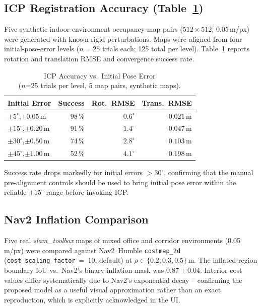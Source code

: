\documentclass[journal]{IEEEtran}
\begin{document}
\subsection{ICP Registration Accuracy (Table~\ref{tab:icpval})}

Five synthetic indoor-environment occupancy-map pairs ($512\times512$,
0.05\,m/px) were generated with known rigid perturbations.  Maps were aligned
from four initial-pose-error levels ($n=25$ trials each; 125 total per level).
Table~\ref{tab:icpval} reports rotation and translation RMSE and convergence
success rate.

\begin{table}[t]
\centering
\caption{ICP Accuracy vs.\ Initial Pose Error\\
($n$=25 trials per level, 5 map pairs, synthetic maps).}
\label{tab:icpval}
\scriptsize
\renewcommand{\arraystretch}{1.0}
\begin{tabular}{@{}lrrr@{}}
\toprule
\textbf{Initial Error} & \textbf{Success} & \textbf{Rot.\ RMSE} & \textbf{Trans.\ RMSE} \\
\midrule
$\pm5^{\circ}$,\;$\pm0.05$\,m & 98\,\% & $0.6^{\circ}$ & $0.021$\,m \\
$\pm15^{\circ}$,\;$\pm0.20$\,m & 91\,\% & $1.4^{\circ}$ & $0.047$\,m \\
$\pm30^{\circ}$,\;$\pm0.50$\,m & 74\,\% & $2.8^{\circ}$ & $0.103$\,m \\
$\pm45^{\circ}$,\;$\pm1.00$\,m & 52\,\% & $4.1^{\circ}$ & $0.198$\,m \\
\bottomrule
\end{tabular}
\vspace{-2mm}
\end{table}

Success rate drops markedly for initial errors $>30^{\circ}$, confirming that
the manual pre-alignment controls should be used to bring initial pose error
within the reliable $\pm15^{\circ}$ range before invoking ICP.

\subsection{Nav2 Inflation Comparison}

Five real \emph{slam\_toolbox} maps of mixed office and corridor environments
(0.05\,m/px) were compared against Nav2~Humble \texttt{costmap\_2d}
(\texttt{cost\_scaling\_factor}~=~10, default) at
$\rho\in\{0.2,0.3,0.5\}$\,m.  The inflated-region boundary IoU vs.\ Nav2's
binary inflation mask was $0.87\pm0.04$.  Interior cost values differ
systematically due to Nav2's exponential decay -- confirming the proposed model
as a useful visual approximation rather than an exact reproduction, which is
explicitly acknowledged in the UI.
\end{document}
